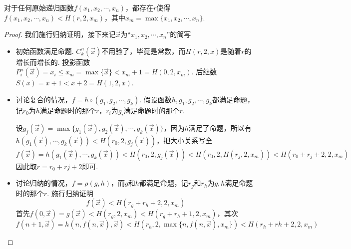 \begin{proposition}{}
    对于任何原始递归函数\(f(x_1,x_2,\cdots,x_n)\)，都存在\(r\)使得\(f(x_1,x_2,\cdots,x_n) < H(r,2,x_m)\)，其中\(x_m = \max\{x_1,x_2,\cdots,x_n\}\).
\end{proposition}

\begin{proof}
    我们施行归纳证明，接下来记\(\vec{x}\)为“\(x_1,x_2,\cdots,x_n\)”的简写
    \begin{itemize}

        \item 初始函数满足命题. \(C^n_k(\vec x)\)不用验了，毕竟是常数，而\(H(r,2,x)\)是随着\(r\)的增长而增长的. 投影函数\(P^n_i(\vec x) = x_i \leq x_m = \max\{\vec x\} < x_m+1 = H(0,2,x_m)\). 后继数\(S(x) = x+1 < x+2 = H(1,2,x)\).
        
        \item 讨论复合的情况，\(f = h \circ(g_1, g_2, \cdots, g_k)\). 假设函数\(h, g_1, g_2, \cdots, g_k\)都满足命题，记\(r_0\)为\(h\)满足命题时的那个\(r\)，\(r_i\)为\(g_i\)满足命题时的那个\(r\). 
        
        设\(g_j(\vec x) = \max\{g_1(\vec x), g_2(\vec x), \cdots, g_k(\vec x)\}\)，因为\(h\)满足了命题，所以有\(h(g_1(\vec x), \cdots, g_k(\vec x)) < H(r_0, 2, g_j(\vec x))\)，把大小关系写全
        \[f(\vec x) =h(g_1(\vec x), \cdots, g_k(\vec x)) <  H(r_0, 2, g_j(\vec x)) < H(r_0, 2, H(r_j, 2, x_m)) < H(r_0+r_j+2, 2, x_m)\]
        因此取\(r = r_0+rj+2\)即可.

        \item 讨论归纳的情况，\(f = \rho(g, h)\)，而\(g\)和\(h\)都满足命题，记\(r_g\)和\(r_h\)为\(g,h\)满足命题时的那个\(r\). 施行归纳证明
        \[f(\vec x) < H(r_g+r_h+2, 2,x_m)\]
        首先\(f(0, \vec x) = g( \vec x) < H(r_g, 2, x_m) < H(r_g+r_h+1,2,x_m)\)，其次
        \[f(n+1, \vec x) = h(n,f(n,\vec x),\vec x) < H(r_h,2,\max\{n,f(n,\vec x),x_m\}) < H(r_h+rh+2, 2, x_m)\]

    \end{itemize}
\end{proof}

